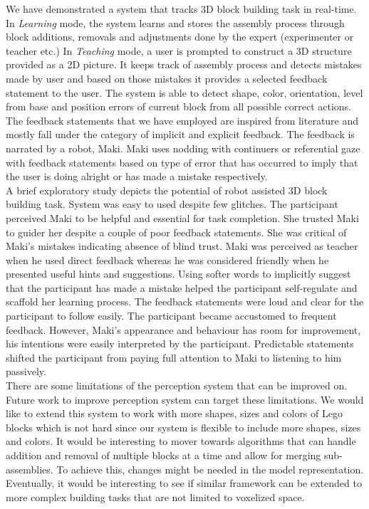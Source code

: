 \label{chap:conclusion}
We have demonstrated a system that tracks 3D block building task in real-time. In \emph{Learning} mode, the system learns and stores the assembly process through block additions, removals and adjustments done by the expert (experimenter or teacher etc.) In \emph{Teaching} mode, a user is prompted to construct a 3D structure provided as a 2D picture. It keeps track of assembly process and detects mistakes made by user and based on those mistakes it provides a selected feedback statement to the user. The system is able to detect shape, color, orientation, level from base and position errors of current block from all possible correct actions. The feedback statements that we have employed are inspired from literature and mostly fall under the category of implicit and explicit feedback. The feedback is narrated by a robot, Maki. Maki uses nodding with continuers or referential gaze with feedback statements based on type of error that has occurred to imply that the user is doing alright or has made a mistake respectively. \\
A brief exploratory study depicts the potential of robot assisted 3D block building task. System was easy to used despite few glitches. The participant perceived Maki to be helpful and essential for task completion. She trusted Maki to guider her despite a couple of poor feedback statements. She was critical of Maki's mistakes indicating absence of blind trust. Maki was perceived as teacher when he used direct feedback whereas he was considered friendly when he presented useful hints and suggestions. Using softer words to implicitly suggest that the participant has made a mistake helped the participant self-regulate and scaffold her learning process. The feedback statements were loud and clear for the participant to follow easily. The participant became accustomed to frequent feedback. However, Maki's appearance and behaviour has room for improvement, his intentions were easily interpreted by the participant. Predictable statements shifted the participant from paying full attention to Maki to listening to him passively.\\
There are some limitations of the perception system that can be improved on. Future work to improve perception system can target these limitations. We would like to extend this system to work with more shapes, sizes and colors of Lego\textsuperscript\textregistered{} blocks which is not hard since our system is flexible to include more shapes, sizes and colors. It would be interesting to mover towards algorithms that can handle addition and removal of multiple blocks at a time and allow for merging sub-assemblies. To achieve this, changes might be needed in the model representation. Eventually, it would be interesting to see if similar framework can be extended to more complex building tasks that are not limited to voxelized space.\\
